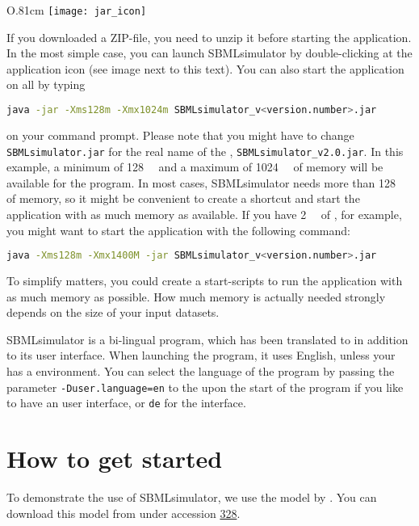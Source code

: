\begin{wrapfigure}{O}{.81cm}
\vspace{\wrapfigspace}
\texttt{[image: jar\_icon]}
\end{wrapfigure}
If you downloaded a ZIP-file, you need to unzip it before starting the application.
In the most simple case, you can launch SBMLsimulator by double-clicking at the \Java application icon (see image next to this text).
You can also start the application on all \OS by typing
\begin{lstlisting}[language=bash,numbers=none]
  java -jar -Xms128m -Xmx1024m SBMLsimulator_v<version.number>.jar
\end{lstlisting}
on your command prompt. Please note that you might have to change
\texttt{SBMLsimulator.jar} for the real name of the \JAR, \eg
\texttt{SBMLsimulator\_v2.0.jar}. In this example, a minimum of \SI{128}{\mega\byte} and a maximum of \SI{1024}{\mega\byte} of memory will be available for the program.
In most cases, SBMLsimulator needs more than \SI{128}{\mega\byte} of memory, so it might be convenient to create a shortcut and start the application with as much memory as available.
If you have \SI{2}{\giga\byte} of \RAM, for example, you might want to start the application with the following command:
\begin{lstlisting}[language=bash,numbers=none]
  java -Xms128m -Xmx1400M -jar SBMLsimulator_v<version.number>.jar
\end{lstlisting}

To simplify matters, you could create a start-scripts to run the application with as much memory as possible.
How much memory is actually needed strongly depends on the size of your input datasets.

SBMLsimulator is a bi-lingual program, which has been translated to \German in addition to its \English user interface.
When launching the program, it uses English, unless your \OS has a \German environment.
You can select the language of the program by passing the parameter \texttt{-Duser.language=en} to the \JVM upon the start of the program if you like to have an \English user interface, or \texttt{de} for the \German interface.


\chapter{How to get started}

To demonstrate the use of SBMLsimulator, we use the model by \citet{Bucher2011}.
You can download this model from \BioModels \citep{Novere2006a} under accession \numero \href{https://identifiers.org/biomodels.db/BIOMD0000000328}{328}. 

